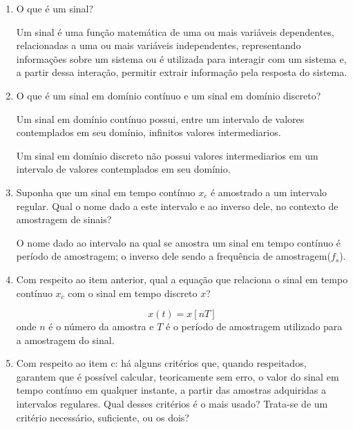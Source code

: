 \documentclass[12pt,a4paper]{article}
\begin{document}
\begin{enumerate}
  \item O que é um sinal? 

  \begin{resposta}
  Um sinal é uma função matemática de uma ou mais variáveis dependentes, relacionadas a uma ou mais variáveis independentes, representando informações sobre um sistema ou é utilizada para interagir com um sistema e, a partir dessa interação, permitir extrair informação pela resposta do sistema.    
  \end{resposta}
  

  \item O que é um sinal em domínio contínuo e um sinal em domínio discreto?
  
  \begin{resposta}
  Um sinal em domínio contínuo possui, entre um intervalo de valores contemplados em seu domínio, infinitos valores intermediarios. 

  Um sinal em domínio discreto não possui valores intermediarios em um intervalo de valores contemplados em seu domínio.
  \end{resposta}

  \item Suponha que um sinal em tempo contínuo $x_c$ é amostrado a um intervalo regular. Qual o
        nome dado a este intervalo e ao inverso dele, no contexto de amostragem de sinais?
  \begin{resposta}
      O nome dado ao intervalo na qual se amostra um sinal em tempo contínuo é período de amostragem; o inverso dele sendo a frequência de amostragem($f_s$).
  \end{resposta}

  \item Com respeito ao item anterior, qual a equação que relaciona o sinal em tempo contínuo $x_c$
        com o sinal em tempo discreto $x$?

  \begin{resposta}
      \begin{equation*}
            x(t)=x[nT]
      \end{equation*}
      onde $n$ é o número da amostra e $T$ é o período de amostragem utilizado para a amostragem do sinal.
  \end{resposta}


  \item Com respeito ao item c: há alguns critérios que, quando respeitados, garantem que é possível
        calcular, teoricamente sem erro, o valor do sinal em tempo contínuo em qualquer instante, a
        partir das amostras adquiridas a intervalos regulares. Qual desses critérios é o mais usado?
        Trata-se de um critério necessário, suficiente, ou os dois?


\end{enumerate}
\end{document}
